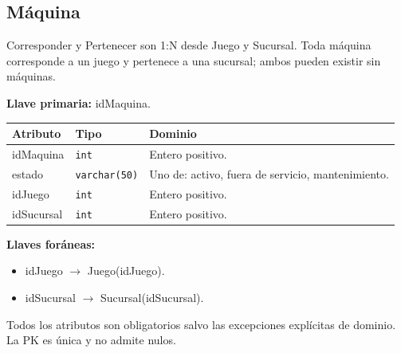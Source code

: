 \par\noindent\begin{minipage}{\textwidth}
\subsection{Máquina}
Corresponder y Pertenecer son 1:N desde Juego y Sucursal. Toda máquina corresponde a un juego y pertenece a una sucursal; ambos pueden existir sin máquinas.\par
\textbf{Llave primaria:} idMaquina.\par
{\small\begin{tabular}{@{}p{}p{}p{}@{}}
\toprule Atributo & Tipo & Dominio \\ \midrule
idMaquina & \texttt{int} & Entero positivo. \\
estado & \texttt{varchar(50)} & Uno de: activo, fuera de servicio, mantenimiento. \\
idJuego & \texttt{int} & Entero positivo. \\
idSucursal & \texttt{int} & Entero positivo. \\
\bottomrule\end{tabular}}
\textbf{Llaves foráneas:}\begin{itemize}[nosep]
\item idJuego $\rightarrow$ Juego(idJuego).
\item idSucursal $\rightarrow$ Sucursal(idSucursal).
\end{itemize}
Todos los atributos son obligatorios salvo las excepciones explícitas de dominio. La PK es única y no admite nulos.
\end{minipage}\par\vspace{.35cm}
